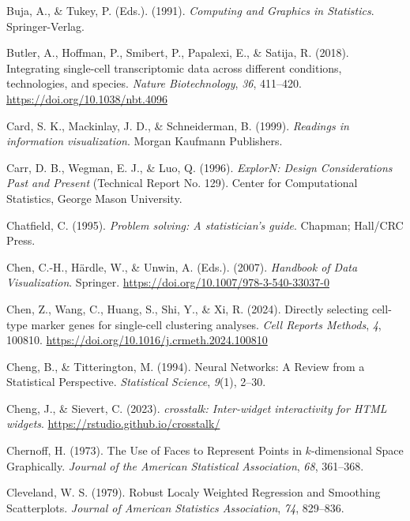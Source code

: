\documentclass[
  letterpaper,
]{krantz}
\newlength{\cslhangindent}
\newenvironment{CSLReferences}[2] %
 {\begin{list}{}{%
  \setlength{\itemindent}{0pt}
  \setlength{\leftmargin}{0pt}
  \setlength{\parsep}{0pt}
  \ifodd #1
   \setlength{\leftmargin}{\cslhangindent}
   \setlength{\itemindent}{-1\cslhangindent}
  \fi
  \setlength{\itemsep}{#2\baselineskip}}}
 {\end{list}}
\begin{document}
\begin{CSLReferences}{1}{0}
Buja, A., \& Tukey, P. (Eds.). (1991). \emph{Computing and {G}raphics in
{S}tatistics}. Springer-Verlag.

Butler, A., Hoffman, P., Smibert, P., Papalexi, E., \& Satija, R.
(2018). Integrating single-cell transcriptomic data across different
conditions, technologies, and species. \emph{Nature Biotechnology},
\emph{36}, 411--420. \url{https://doi.org/10.1038/nbt.4096}

Card, S. K., Mackinlay, J. D., \& Schneiderman, B. (1999).
\emph{Readings in information visualization}. Morgan Kaufmann
Publishers.

Carr, D. B., Wegman, E. J., \& Luo, Q. (1996). \emph{Explor{N}: {D}esign
{C}onsiderations {P}ast and {P}resent} (Technical Report No. 129).
Center for Computational Statistics, George Mason University.

Chatfield, C. (1995). \emph{Problem solving: A statistician's guide}.
Chapman; Hall/CRC Press.

Chen, C.-H., Härdle, W., \& Unwin, A. (Eds.). (2007). \emph{Handbook of
{D}ata {V}isualization}. Springer.
\url{https://doi.org/10.1007/978-3-540-33037-0}

Chen, Z., Wang, C., Huang, S., Shi, Y., \& Xi, R. (2024). Directly
selecting cell-type marker genes for single-cell clustering analyses.
\emph{Cell Reports Methods}, \emph{4}, 100810.
\url{https://doi.org/10.1016/j.crmeth.2024.100810}

Cheng, B., \& Titterington, M. (1994). Neural {N}etworks: {A} {R}eview
from a {S}tatistical {P}erspective. \emph{Statistical Science},
\emph{9}(1), 2--30.

Cheng, J., \& Sievert, C. (2023). \emph{{crosstalk}: Inter-widget
interactivity for HTML widgets}.
\url{https://rstudio.github.io/crosstalk/}

Chernoff, H. (1973). The {U}se of {F}aces to {R}epresent {P}oints in
\(k\)-dimensional {S}pace {G}raphically. \emph{Journal of the American
Statistical Association}, \emph{68}, 361--368.

Cleveland, W. S. (1979). Robust {L}ocaly {W}eighted {R}egression and
{S}moothing {S}catterplots. \emph{Journal of American Statistics
Association}, \emph{74}, 829--836.


\end{CSLReferences}
\end{document}
